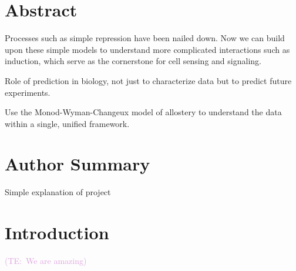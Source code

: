 \documentclass[10pt,letterpaper]{article}
\date{}
\newcommand{\talComment}[1]{\textcolor{Plum}{(TE:~#1)}}
\begin{document}

	
\vspace*{0.35in}

\begin{flushleft}
{\Large
\textbf{}
}
\end{flushleft}


\section*{Abstract} 

Processes such as simple repression have been nailed down. Now we can build upon these simple models to understand more complicated interactions such as induction, which serve as the cornerstone for cell sensing and signaling.

Role of prediction in biology, not just to characterize data but to predict future experiments.

Use the Monod-Wyman-Changeux model of
allostery to understand the data within a single, unified framework.



\section*{Author Summary} 

Simple explanation of project


\section*{Introduction}

\talComment{We are amazing}
\end{document}
